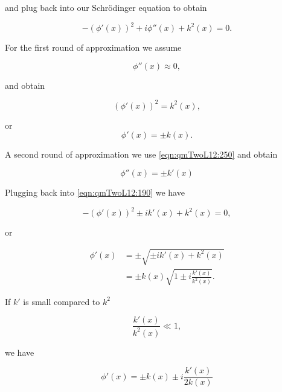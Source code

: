 and plug back into our Schr\"{o}dinger equation to obtain

\begin{equation}\label{eqn:qmTwoL12:190}
- (\phi'(x))^2 + i \phi''(x) + k^2(x) = 0.
\end{equation}

For the first round of approximation we assume

\begin{equation}\label{eqn:qmTwoL12:210}
\phi''(x) \approx 0,
\end{equation}

and obtain

\begin{equation}\label{eqn:qmTwoL12:230}
(\phi'(x))^2 = k^2(x),
\end{equation}

or
\begin{equation}\label{eqn:qmTwoL12:250}
\phi'(x) = \pm k(x).
\end{equation}

A second round of approximation we use \ref{eqn:qmTwoL12:250} and obtain

\begin{equation}\label{eqn:qmTwoL12:250b}
\phi''(x) = \pm k'(x)
\end{equation}

Plugging back into \ref{eqn:qmTwoL12:190} we have

\begin{equation}\label{eqn:qmTwoL12:270}
-(\phi'(x))^2 \pm i k'(x) + k^2(x) = 0,
\end{equation}

or

\begin{equation}\label{eqn:qmTwoL12:290}
\begin{aligned}
\phi'(x) 
&= \pm \sqrt{ \pm i k'(x) + k^2(x) } \\
&= \pm k(x) \sqrt{ 1 \pm i \frac{k'(x)}{k^2(x)} } .
\end{aligned}
\end{equation}

If $k'$ is small compared to $k^2$

\begin{equation}\label{eqn:qmTwoL12:310}
\frac{k'(x)}{k^2(x)} \ll 1, 
\end{equation}

we have

\begin{equation}\label{eqn:qmTwoL12:330}
\phi'(x) 
= \pm k(x) \pm i \frac{k'(x)}{2 k(x)}  
\end{equation}

